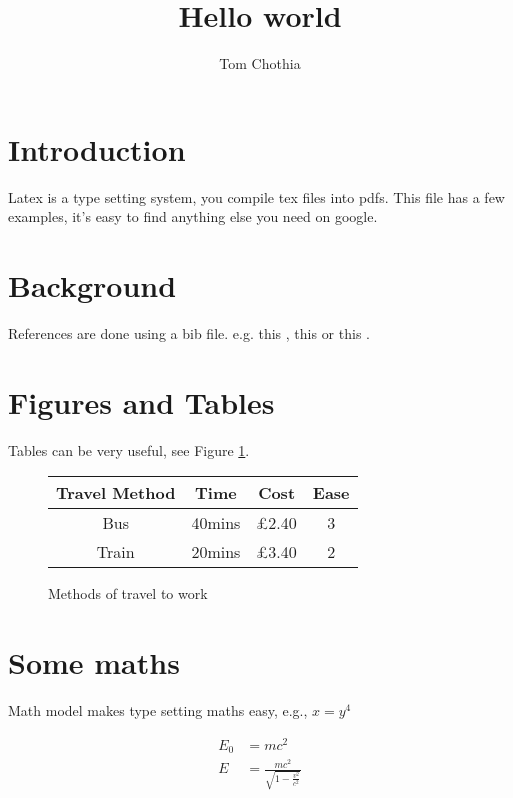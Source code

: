 \documentclass[12pt]{article}
\begin{document}
\title{Hello world}
\author{Tom Chothia}

\maketitle



\section{Introduction}

Latex is a type setting system, you compile tex files into pdfs. This file has a few examples, it's easy to find anything else you need on google.

\section{ Background}
References are done using a bib file. e.g. this \cite{bhargavan2016practical}, this \cite{bantin2010} or this \cite{brualdi2010introductory}.


\section{Figures and Tables}

Tables can be very useful, see Figure \ref{fig:travel}.

\begin{figure}[t]
\begin{center}
\begin{tabular}{c | c | c |  c}
Travel Method & Time & Cost & Ease \\
\hline
Bus & 40mins & \pounds 2.40 & 3 \\
Train & 20mins & \pounds 3.40 & 2 \\
\end{tabular}
\end{center}
\caption{Methods of travel to work}
\label{fig:travel}
\end{figure}

\section{Some maths}

Math model makes type setting maths easy, e.g., $x = y^4$

  \begin{align}
    E_0 &= mc^2 \\
    E &= \frac{mc^2}{\sqrt{1-\frac{v^2}{c^2}}}
  \end{align}  
  

  
  


  
\end{document}
